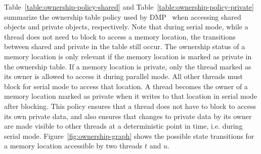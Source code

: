 Table~\ref{table:ownership-policy-shared} and
Table~\ref{table:ownership-policy-private} summarize the ownership
table policy used by DMP~\cite{dmp} when accessing shared objects and
private objects, respectively.  Note that during serial mode, while a
thread does not need to block to access a memory location, the
transitions between shared and private in the table still occur.  The
ownership status of a memory location is only relevant if the memory
location is marked as private in the ownership table.  If a memory
location is private, only the thread marked as its owner is allowed to
access it during parallel mode.  All other threads must block for
serial mode to access that location.  A thread becomes the owner of a
memory location marked as private when it writes to that location in
serial mode after blocking.  This policy ensures that a thread does
not have to block to access its own private data, and also ensures
that changes to private data by its owner are made visible to other
threads at a deterministic point in time, i.e. during serial mode.
Figure~\ref{fig:ownership-graph} shows the possible state transitions
for a memory location accessible by two threads $t$ and $u$.

